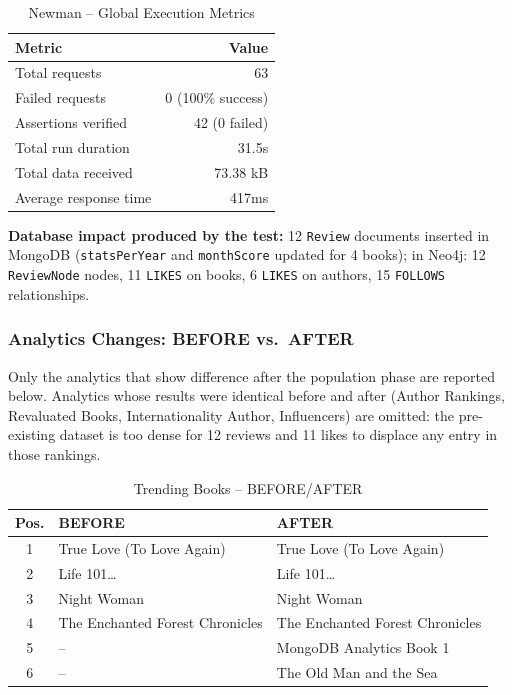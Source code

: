 \begin{table}[H]
    \centering
    \caption{Newman -- Global Execution Metrics}
    \label{tab:newman_results}
    \begin{tabular}{@{}lr@{}}
        \toprule
        \textbf{Metric} & \textbf{Value} \\ \midrule
        Total requests & 63 \\
        Failed requests & 0 (100\% success) \\
        Assertions verified & 42 (0 failed) \\
        Total run duration & 31.5s \\
        Total data received & 73.38 kB \\
        Average response time & 417ms \\
        \bottomrule
    \end{tabular}
\end{table}

\textbf{Database impact produced by the test:} 12 \texttt{Review} documents inserted in MongoDB (\texttt{statsPerYear} and \texttt{monthScore} updated for 4 books); in Neo4j: 12 \texttt{ReviewNode} nodes, 11 \texttt{LIKES} on books, 6 \texttt{LIKES} on authors, 15 \texttt{FOLLOWS} relationships.

\subsubsection{Analytics Changes: BEFORE vs.\ AFTER}

Only the analytics that show  difference after the population phase are reported below. Analytics whose results were identical before and after (Author Rankings, Revaluated Books, Internationality Author, Influencers) are omitted: the pre-existing dataset is too dense for 12 reviews and 11 likes to displace any entry in those rankings.

\begin{table}[H]
    \centering\small
    \caption{Trending Books -- BEFORE/AFTER}
    \label{tab:trending_before_after}
    \begin{tabular}{@{}cll@{}}
        \toprule
        \textbf{Pos.} & \textbf{BEFORE} & \textbf{AFTER} \\ \midrule
        1 & True Love (To Love Again) & True Love (To Love Again) \\
        2 & Life 101\ldots           & Life 101\ldots \\
        3 & Night Woman              & Night Woman \\
        4 & The Enchanted Forest Chronicles & The Enchanted Forest Chronicles \\
        5 & --                       & MongoDB Analytics Book 1 \\
        6 & --                       & The Old Man and the Sea \\
        \bottomrule
    \end{tabular}
\end{table}

